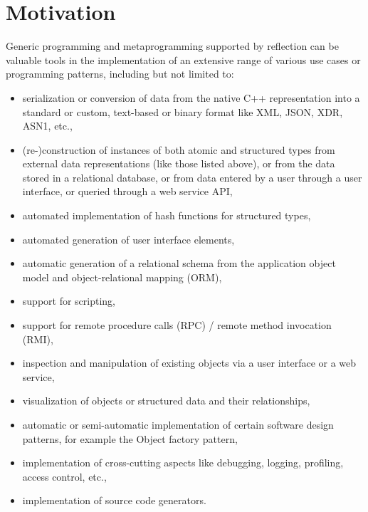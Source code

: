\section{Motivation}

Generic programming and metaprogramming supported by reflection can be valuable
tools in the implementation of an extensive range of various use cases or
programming patterns, including but not limited to:

\begin{itemize}

\item serialization or conversion of data from the native C++ representation
into a standard or custom, text-based or binary format like XML, JSON, XDR, ASN1,
etc.,

\item (re-)construction of instances of both atomic and structured types
from external data representations (like those listed above), or
from the data stored in a relational database, or from data entered by
a user through a user interface, or queried through a web service API,

\item automated implementation of hash functions for structured types,

\item automated generation of user interface elements,

\item automatic generation of a relational schema from the application
object model and object-relational mapping (ORM),

\item support for scripting,

\item support for remote procedure calls (RPC) / remote method invocation (RMI),

\item inspection and manipulation of existing objects via a user interface
or a web service,

\item visualization of objects or structured data and their relationships,

\item automatic or semi-automatic implementation of certain software design
patterns, for example the Object factory pattern,

\item implementation of cross-cutting aspects like debugging, logging, profiling,
access control, etc.,

\item implementation of source code generators.

\end{itemize}

